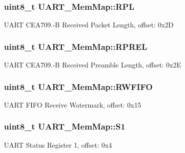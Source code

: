 \subsubsection[{R\+P\+L}]{\setlength{\rightskip}{0pt plus 5cm}uint8\+\_\+t U\+A\+R\+T\+\_\+\+Mem\+Map\+::\+R\+P\+L}\label{struct_u_a_r_t___mem_map_ad9124bf6041c389a9e13aee5953aa6f6}
U\+A\+R\+T C\+E\+A709.-\/\+B Received Packet Length, offset\+: 0x2\+D \hypertarget{struct_u_a_r_t___mem_map_a30a3dfe8a84c49980087e5b1e5442001}{}
\subsubsection[{R\+P\+R\+E\+L}]{\setlength{\rightskip}{0pt plus 5cm}uint8\+\_\+t U\+A\+R\+T\+\_\+\+Mem\+Map\+::\+R\+P\+R\+E\+L}\label{struct_u_a_r_t___mem_map_a30a3dfe8a84c49980087e5b1e5442001}
U\+A\+R\+T C\+E\+A709.-\/\+B Received Preamble Length, offset\+: 0x2\+E \hypertarget{struct_u_a_r_t___mem_map_a3086e55b624e5192d20cec4736ee974c}{}
\subsubsection[{R\+W\+F\+I\+F\+O}]{\setlength{\rightskip}{0pt plus 5cm}uint8\+\_\+t U\+A\+R\+T\+\_\+\+Mem\+Map\+::\+R\+W\+F\+I\+F\+O}\label{struct_u_a_r_t___mem_map_a3086e55b624e5192d20cec4736ee974c}
U\+A\+R\+T F\+I\+F\+O Receive Watermark, offset\+: 0x15 \hypertarget{struct_u_a_r_t___mem_map_a7eb8df4e43194dbd9f1d9bd4ab742cca}{}
\subsubsection[{S1}]{\setlength{\rightskip}{0pt plus 5cm}uint8\+\_\+t U\+A\+R\+T\+\_\+\+Mem\+Map\+::\+S1}\label{struct_u_a_r_t___mem_map_a7eb8df4e43194dbd9f1d9bd4ab742cca}
U\+A\+R\+T Status Register 1, offset\+: 0x4 \hypertarget{struct_u_a_r_t___mem_map_a6107c55f4dba727e1a4e70f76acd7b20}{}
